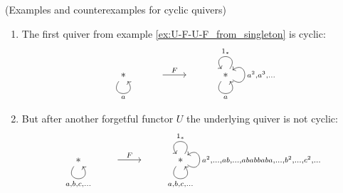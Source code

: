 \begin{example}{(Examples and counterexamples for cyclic quivers)}
\begin{enumerate}
not explicitly cyclic.
\item The first quiver from example \ref{ex:U-F-U-F_from_singleton} is cyclic:\\
\[
\begin{tikzcd}
\ast \arrow["a"', loop, distance=2em, in=305, out=235] & {} \arrow[r, "F"] & {} & \ast \arrow["a"', loop, distance=2em, in=305, out=235] \arrow["1_{\ast}"', loop, distance=2em, in=125, out=55] \arrow["{{a^{2}, a^{3},\dots}}"', loop, distance=2em, in=35, out=325]
\end{tikzcd}
\]
\item But after another forgetful functor $U$ the underlying quiver is not cyclic:\\
\[
\begin{tikzcd}
\ast \arrow["{a, b, c,\dots}"', loop, distance=2em, in=305, out=235] & {} \arrow[r, "F"] & {} & \ast \arrow["{a, b, c,\dots}"', loop, distance=2em, in=305, out=235] \arrow["1_{\ast}"', loop, distance=2em, in=125, out=55] \arrow["{a^{2},\dots,ab,\dots,ababbaba,\dots,b^{2},\dots,c^{2},\dots}"', loop, distance=2em, in=35, out=325]
\end{tikzcd}
\]
\end{enumerate}
\end{example}

